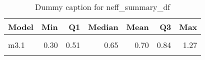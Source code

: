 \begin{table}
\centering
\caption{Dummy caption for neff_summary_df}
\centering
\fontsize{10}{12}\selectfont
\begin{tabular}[t]{lrrrrrr}
\toprule
Model & Min & Q1 & Median & Mean & Q3 & Max\\
\midrule
\cellcolor{gray!10}{m2} & \cellcolor{gray!10}{0.28} & \cellcolor{gray!10}{0.40} & \cellcolor{gray!10}{0.61} & \cellcolor{gray!10}{0.64} & \cellcolor{gray!10}{0.85} & \cellcolor{gray!10}{1.26}\\
m3.1 & 0.30 & 0.51 & 0.65 & 0.70 & 0.84 & 1.27\\
\cellcolor{gray!10}{m4} & \cellcolor{gray!10}{0.42} & \cellcolor{gray!10}{0.59} & \cellcolor{gray!10}{0.72} & \cellcolor{gray!10}{0.89} & \cellcolor{gray!10}{1.12} & \cellcolor{gray!10}{1.80}\\
\bottomrule
\end{tabular}
\end{table}
